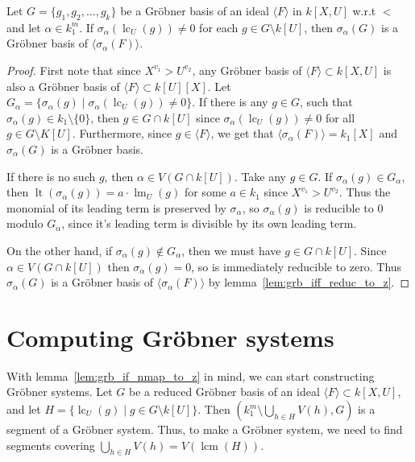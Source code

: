 \documentclass[a4paper, 12pt]{article}
\DeclareMathOperator{\LT}{lt}
\DeclareMathOperator{\LM}{lm}
\DeclareMathOperator{\LC}{lc}
\DeclareMathOperator{\lcm}{lcm}
\theoremstyle{changedot}
\theoremstyle{changedotbreak}
\theoremstyle{nonumberplain}
\newtheorem{proof}{Proof}
\begin{document}
\begin{lemma}\label{lem:grb_if_nmap_to_z}
  Let $G = \{g_{1}, g_{2}, \dots, g_{k}\}$ be a Gröbner basis of an ideal $\langle F \rangle$ in $k[X, U]$ w.r.t $<$ and let $\alpha \in k_{1}^{m}$. If $\sigma_{\alpha}(\LC_{U}(g)) \neq 0$ for each $g \in G \setminus k[U]$, then $\sigma_{\alpha}(G)$ is a Gröbner basis of $\langle \sigma_{\alpha}(F) \rangle$.
\end{lemma}
\begin{proof}
  First note that since $X^{v_{1}} > U^{v_{2}}$, any Gröbner basis of $\langle F \rangle \subset k[X, U]$ is also a Gröbner basis of $\langle F \rangle \subset k[U][X]$. Let $G_{\alpha} = \{\sigma_{\alpha}(g) \mid \sigma_{\alpha}(\LC_{U}(g)) \neq 0\}$. If there is any $g \in G$, such that $\sigma_{\alpha}(g) \in k_{1} \setminus \{0\}$, then $g \in G \cap k[U]$ since $\sigma_{\alpha}(\LC_{U}(g)) \neq 0$ for all $g \in G \setminus K[U]$. Furthermore, since $g \in \langle F \rangle$, we get that $\langle \sigma_{\alpha}(F) \rangle = k_{1}[X]$ and $\sigma_{\alpha}(G)$ is a Gröbner basis.

  If there is no such $g$, then $\alpha \in V(G \cap k[U])$. Take any $g \in G$. If $\sigma_{\alpha}(g) \in G_{\alpha}$, then $\LT(\sigma_{\alpha}(g)) = a \cdot \LM_{U}(g)$ for some $a \in k_{1}$ since $X^{v_{1}} > U^{v_{2}}$. Thus the monomial of its leading term is preserved by $\sigma_{\alpha}$, so $\sigma_{\alpha}(g)$ is reducible to $0$ modulo $G_{\alpha}$, since it's leading term is divisible by its own leading term.

  On the other hand, if $\sigma_{\alpha}(g) \notin G_{\alpha}$, then we must have $g \in G \cap k[U]$. Since $\alpha \in V(G \cap k[U])$ then $\sigma_{\alpha}(g) = 0$, so is immediately reducible to zero. Thus $\sigma_{\alpha}(G)$ is a Gröbner basis of $\langle \sigma_{\alpha}(F) \rangle$ by lemma~\ref{lem:grb_iff_reduc_to_z}.
\end{proof}

\section{Computing Gröbner systems}

With lemma~\ref{lem:grb_if_nmap_to_z} in mind, we can start constructing Gröbner systems. Let $G$ be a reduced Gröbner basis of an ideal $\langle F \rangle \subset k[X, U]$, and let $H = \{\LC_{U}(g) \mid g \in G \setminus k[U]\}$. Then $\left(k_{1}^{m} \setminus \bigcup_{h \in H} V(h), G\right)$ is a segment of a Gröbner system. Thus, to make a Gröbner system, we need to find segments covering $\bigcup_{h \in H} V(h) = V(\lcm(H))$.
\end{document}
